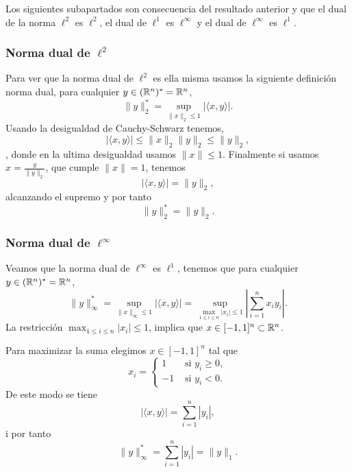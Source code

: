 Los siguientes subapartados son consecuencia del resultado anterior y que el dual de la norma $\ell^2$ es $\ell^2$,
el dual de $\ell^1$ es $\ell^\infty$ y el dual de $\ell^\infty$ es $\ell^1$.

\subsubsection*{Norma dual de $\ell^2$}

Para ver que la norma dual de $\ell^2$ es ella misma usamos la siguiente definición norma dual,
para cualquier $y \in (\mathbb{R}^n)^* = \mathbb{R}^n$,
\begin{equation*}
    \| y \|_{2}^{*} = \sup_{\| x \|_2 \leq 1} | \langle x, y \rangle |.
\end{equation*}
Usando la desigualdad de Cauchy-Schwarz tenemos,
\begin{equation*}
        | \langle x, y \rangle |
        \leq \| x \|_2 \| y \|_2
        \leq \| y \|_2,
\end{equation*},
donde en la ultima desigualdad usamos $\| x \| \leq 1$.
Finalmente si usamos $x = \frac{y}{\| y \|_2}$, que cumple $\| x \| = 1$,
tenemos
\begin{equation*}
    | \langle x, y \rangle | = \| y \|_2,
\end{equation*}
alcanzando el supremo y por tanto
\begin{equation*}
    \| y \|_{2}^{*} = \| y \|_2.
\end{equation*}

\subsubsection*{Norma dual de $\ell^\infty$}

Veamos que la norma dual de $\ell^\infty$ es $\ell^1$,
tenemos que para cualquier $y \in (\mathbb{R}^n)^* = \mathbb{R}^n$,
\begin{equation*}
    \| y \|_{\infty}^{*} = \sup_{\| x \|_\infty \leq 1} | \langle x, y \rangle |
        = \sup_{\max_{1 \leq i \leq n} |x_i| \leq 1} \left| \sum_{i = 1}^{n} x_i y_i \right|.
\end{equation*}
La restricción $\max_{1 \leq i \leq n} |x_i| \leq 1$,
implica que $x \in [-1, 1]^n \subset \mathbb{R}^n$.

Para maximizar la suma elegimos $x \in[-1, 1]^n$ tal que
\begin{equation*}
    x_i = \left\{
    \begin{aligned}
        1     & \text{ si } y_i \geq 0, \\
        -1    & \text{ si } y_i < 0.
    \end{aligned}
        \right.
\end{equation*}
De este modo se tiene
\begin{equation*}
    | \langle x, y \rangle | = \sum_{i = 1}^{n} |y_i|,
\end{equation*}
i por tanto
\begin{equation*}
    \| y \|_{\infty}^{*} = \sum_{i = 1}^{n} |y_i| = \| y \|_1.
\end{equation*}

